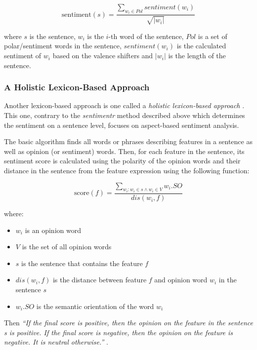 \begin{equation}
\textrm{sentiment}(s) = \frac{\sum_{w_{i} \in Pol} sentiment(w_{i})}{\sqrt{|w_{i}|}}
\end{equation}

where $s$ is the sentence, $w_{i}$ is the $i$-th word of the sentence, $Pol$ is a set of polar/sentiment words in the sentence, $sentiment(w_{i})$ is the calculated sentiment of $w_{i}$ based on the valence shifters and $|w_{i}|$ is the length of the sentence.


\subsubsection{A Holistic Lexicon-Based Approach}
\label{sec:holistic_approach}
Another lexicon-based approach is one called a \textit{holistic lexicon-based approach} \cite{ding_hu_liu}. This one, contrary to the \textit{sentimentr} method described above which determines the sentiment on a sentence level, focuses on aspect-based sentiment analysis. 

The basic algorithm finds all words or phrases describing features in a sentence as well as opinion (or sentiment) words. Then, for each feature in the sentence, its sentiment score is calculated using the polarity of the opinion words and their distance in the sentence from the feature expression using the following function:

\begin{equation}
\textrm{score}(f) = \frac{\sum_{w_{i} : w_{i} \in s \wedge w_{i} \in V}w_{i}.SO}{dis(w_{i},f)}
\end{equation}

where:
\begin{itemize}
\item $w_{i}$ is an opinion word
\item $V$ is the set of all opinion words
\item $s$ is the sentence that contains the feature $f$
\item  $dis(w_{i} , f)$ is the distance between feature $f$ and
opinion word $w_{i}$ in the sentence $s$
\item $w_i.SO$ is the semantic orientation of the word $w_{i}$
\end{itemize}
Then \textit{``If the final score is positive, then the opinion on the feature in
the sentence s is positive. If the final score is negative, then
the opinion on the feature is negative. It is neutral otherwise.''} \cite[p. 5]{ding_hu_liu}.

